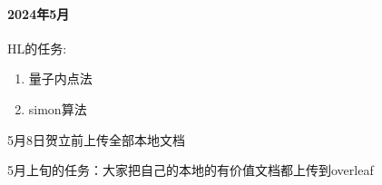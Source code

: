 \paragraph{2024年5月}HL的任务:
\begin{enumerate}
    \item 量子内点法
    \item simon算法
\end{enumerate}

5月8日贺立前上传全部本地文档

5月上旬的任务：大家把自己的本地的有价值文档都上传到overleaf
